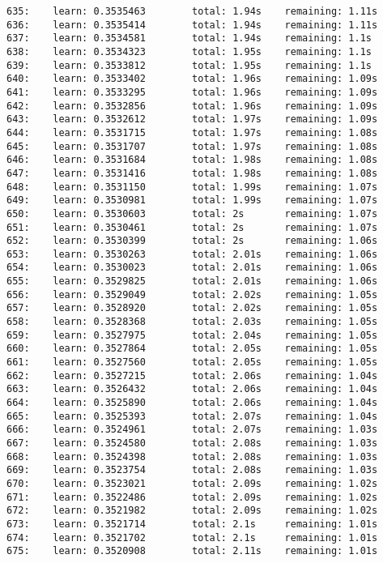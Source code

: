 \documentclass[11pt]{article}
\begin{document}
\begin{Verbatim}[commandchars=\\\{\}]
635:    learn: 0.3535463        total: 1.94s    remaining: 1.11s
636:    learn: 0.3535414        total: 1.94s    remaining: 1.11s
637:    learn: 0.3534581        total: 1.94s    remaining: 1.1s
638:    learn: 0.3534323        total: 1.95s    remaining: 1.1s
639:    learn: 0.3533812        total: 1.95s    remaining: 1.1s
640:    learn: 0.3533402        total: 1.96s    remaining: 1.09s
641:    learn: 0.3533295        total: 1.96s    remaining: 1.09s
642:    learn: 0.3532856        total: 1.96s    remaining: 1.09s
643:    learn: 0.3532612        total: 1.97s    remaining: 1.09s
644:    learn: 0.3531715        total: 1.97s    remaining: 1.08s
645:    learn: 0.3531707        total: 1.97s    remaining: 1.08s
646:    learn: 0.3531684        total: 1.98s    remaining: 1.08s
647:    learn: 0.3531416        total: 1.98s    remaining: 1.08s
648:    learn: 0.3531150        total: 1.99s    remaining: 1.07s
649:    learn: 0.3530981        total: 1.99s    remaining: 1.07s
650:    learn: 0.3530603        total: 2s       remaining: 1.07s
651:    learn: 0.3530461        total: 2s       remaining: 1.07s
652:    learn: 0.3530399        total: 2s       remaining: 1.06s
653:    learn: 0.3530263        total: 2.01s    remaining: 1.06s
654:    learn: 0.3530023        total: 2.01s    remaining: 1.06s
655:    learn: 0.3529825        total: 2.01s    remaining: 1.06s
656:    learn: 0.3529049        total: 2.02s    remaining: 1.05s
657:    learn: 0.3528920        total: 2.02s    remaining: 1.05s
658:    learn: 0.3528368        total: 2.03s    remaining: 1.05s
659:    learn: 0.3527975        total: 2.04s    remaining: 1.05s
660:    learn: 0.3527864        total: 2.05s    remaining: 1.05s
661:    learn: 0.3527560        total: 2.05s    remaining: 1.05s
662:    learn: 0.3527215        total: 2.06s    remaining: 1.04s
663:    learn: 0.3526432        total: 2.06s    remaining: 1.04s
664:    learn: 0.3525890        total: 2.06s    remaining: 1.04s
665:    learn: 0.3525393        total: 2.07s    remaining: 1.04s
666:    learn: 0.3524961        total: 2.07s    remaining: 1.03s
667:    learn: 0.3524580        total: 2.08s    remaining: 1.03s
668:    learn: 0.3524398        total: 2.08s    remaining: 1.03s
669:    learn: 0.3523754        total: 2.08s    remaining: 1.03s
670:    learn: 0.3523021        total: 2.09s    remaining: 1.02s
671:    learn: 0.3522486        total: 2.09s    remaining: 1.02s
672:    learn: 0.3521982        total: 2.09s    remaining: 1.02s
673:    learn: 0.3521714        total: 2.1s     remaining: 1.01s
674:    learn: 0.3521702        total: 2.1s     remaining: 1.01s
675:    learn: 0.3520908        total: 2.11s    remaining: 1.01s

\end{Verbatim}
\end{document}
